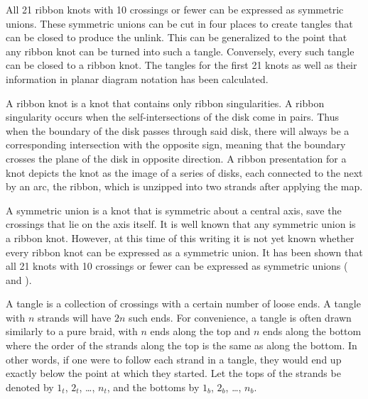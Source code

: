 
\theorems

\begin{paperabstract}
All 21 ribbon knots with 10 crossings or fewer can be expressed as symmetric
unions.
These symmetric unions can be cut in four places to create tangles that can be
closed to produce the unlink.
This can be generalized to the point that any ribbon knot can be turned into
such a tangle.
Conversely, every such tangle can be closed to a ribbon knot.
The tangles for the first 21 knots as well as their information in planar
diagram notation has been calculated.
\end{paperabstract}
\begin{paper}

A ribbon knot is a knot that contains only ribbon singularities.
A ribbon singularity occurs when the self-intersections of the disk come in
pairs.
Thus when the boundary of the disk passes through said disk, there will always
be a corresponding intersection with the opposite sign, meaning that the
boundary crosses the plane of the disk in opposite direction.
A ribbon presentation for a knot depicts the knot as the image of a series
of disks, each connected to the next by an arc, the ribbon, which is unzipped
into two strands after applying the map.

A symmetric union is a knot that is symmetric about a central axis, save the
crossings that lie on the axis itself.
It is well known that any symmetric union is a ribbon knot.
However, at this time of this writing it is not yet known whether every ribbon
knot can be expressed as a symmetric union.
It has been shown that all 21 knots with 10 crossings or fewer can be expressed
as symmetric unions (\cite{oneknot} and \cite{manyknots}).

A tangle is a collection of crossings with a certain number of loose ends.
A tangle with $n$ strands will have $2n$ such ends.
For convenience, a tangle is often drawn similarly to a pure braid, with $n$
ends along the top and $n$ ends along the bottom where the order of the strands
along the top is the same as along the bottom.
In other words, if one were to follow each strand in a tangle, they would end up
exactly below the point at which they started.
Let the tops of the strands be denoted by $1_t$, $2_t$, \dots, $n_t$, and the
bottoms  by $1_b$, $2_b$, \dots, $n_b$.


\end{paper}
